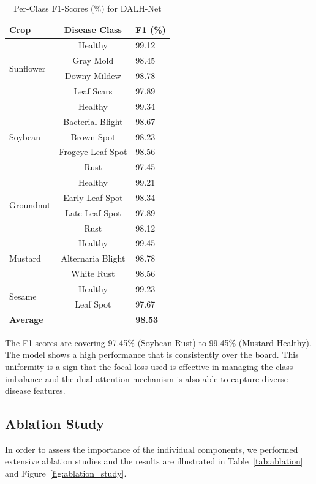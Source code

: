 \documentclass[default, iicol]{sn-jnl}
\theoremstyle{thmstyleone}%
\theoremstyle{thmstyletwo}%
\theoremstyle{thmstylethree}%
\begin{document}
\begin{table}[htbp]
\centering
\caption{Per-Class F1-Scores (\%) for DALH-Net}
\label{tab:perclass}
\begin{tabular}{l|c|l}
\toprule
\textbf{Crop} & \textbf{Disease Class} & \textbf{F1 (\%)} \\
\midrule
\multirow{4}{*}{Sunflower} & Healthy & 99.12 \\
& Gray Mold & 98.45 \\
& Downy Mildew & 98.78 \\
& Leaf Scars & 97.89 \\
\midrule
\multirow{5}{*}{Soybean} & Healthy & 99.34 \\
& Bacterial Blight & 98.67 \\
& Brown Spot & 98.23 \\
& Frogeye Leaf Spot & 98.56 \\
& Rust & 97.45 \\
\midrule
\multirow{4}{*}{Groundnut} & Healthy & 99.21 \\
& Early Leaf Spot & 98.34 \\
& Late Leaf Spot & 97.89 \\
& Rust & 98.12 \\
\midrule
\multirow{3}{*}{Mustard} & Healthy & 99.45 \\
& Alternaria Blight & 98.78 \\
& White Rust & 98.56 \\
\midrule
\multirow{2}{*}{Sesame} & Healthy & 99.23 \\
& Leaf Spot & 97.67 \\
\midrule
\multicolumn{2}{l}{\textbf{Average}} & \textbf{98.53} \\
\bottomrule
\end{tabular}
\end{table}

The F1-scores are covering 97.45\% (Soybean Rust) to 99.45\% (Mustard Healthy). The model shows a high performance that is consistently over the board. This uniformity is a sign that the focal loss used is effective in managing the class imbalance and the dual attention mechanism is also able to capture diverse disease features.

\subsection{Ablation Study}

In order to assess the importance of the individual components, we performed extensive ablation studies and the results are illustrated in Table~\ref{tab:ablation} and Figure~\ref{fig:ablation_study}.
\end{document}
